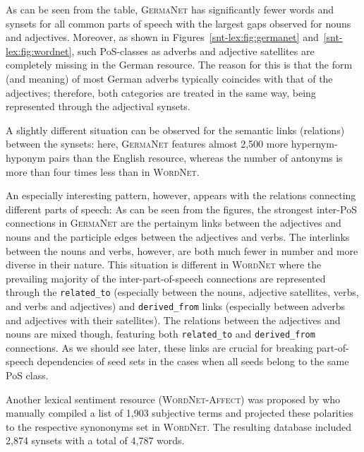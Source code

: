 As can be seen from the table, \textsc{GermaNet} has significantly
fewer words and synsets for all common parts of speech with the
largest gaps observed for nouns and adjectives.  Moreover, as shown in
Figures~\ref{snt-lex:fig:germanet} and~\ref{snt-lex:fig:wordnet}, such
PoS-classes as adverbs and adjective satellites are completely missing
in the German resource.  The reason for this is that the form (and
meaning) of most German adverbs typically coincides with that of the
adjectives; therefore, both categories are treated in the same way,
being represented through the adjectival synsets.

A slightly different situation can be observed for the semantic links
(relations) between the synsets: here, \textsc{GermaNet} features
almost 2,500 more hypernym-hyponym pairs than the English resource,
whereas the number of antonyms is more than four times less than in
\textsc{WordNet}.

An especially interesting pattern, however, appears with the relations
connecting different parts of speech: As can be seen from the figures,
the strongest inter-PoS connections in \textsc{GermaNet} are the
pertainym links between the adjectives and nouns and the participle
edges between the adjectives and verbs.  The interlinks between the
nouns and verbs, however, are both much fewer in number and more
diverse in their nature.  This situation is different in
\textsc{WordNet} where the prevailing majority of the
inter-part-of-speech connections are represented through the
\texttt{related\_to} (especially between the nouns, adjective
satellites, verbs, and verbs and adjectives) and
\texttt{derived\_from} links (especially between adverbs and
adjectives with their satellites).  The relations between the
adjectives and nouns are mixed though, featuring both
\texttt{related\_to} and \texttt{derived\_from} connections.  As we
should see later, these links are crucial for breaking part-of-speech
dependencies of seed sets in the cases when all seeds belong to the
same PoS class.

Another lexical sentiment resource (\textsc{WordNet-Affect}) was
proposed by \citet{Strapparava:04} who manually compiled a list of
1,903 subjective terms and projected these polarities to the
respective synononyms set in \textsc{WordNet}.  The resulting database
included 2,874 synsets with a total of 4,787 words.



